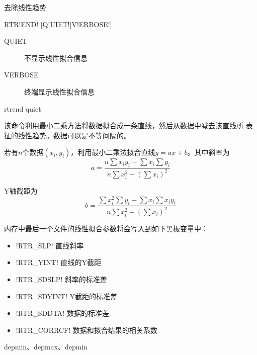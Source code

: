\label{cmd:rtrend}

去除线性趋势

\begin{SACSTX}
RTR!END! [Q!UIET!|V!ERBOSE!]
\end{SACSTX}

\begin{description}
\item [QUIET] 不显示线性拟合信息
\item [VERBOSE] 终端显示线性拟合信息
\end{description}

\begin{SACDFT}
rtrend quiet
\end{SACDFT}

该命令利用最小二乘方法将数据拟合成一条直线，然后从数据中减去该直线所
表征的线性趋势。数据可以是不等间隔的。

若有$n$个数据$(x_i,y_i)$，利用最小二乘法拟合直线$y=ax+b$。其中斜率为
\[
    a = \frac{n\sum x_i y_i - \sum x_i \sum y_i}
    {n\sum x_i^2 - (\sum x_i)^2}
\]

Y轴截距为
\[
    b = \frac{\sum x_i^2 \sum y_i - \sum x_i \sum x_i y_i}
    {n\sum x_i^2 - (\sum x_i)^2}
\]

内存中最后一个文件的线性拟合参数将会写入到如下黑板变量中：
\begin{itemize}
\item !RTR_SLP! 直线斜率
\item !RTR_YINT! 直线的Y截距
\item !RTR_SDSLP! 斜率的标准差
\item !RTR_SDYINT! Y截距的标准差
\item !RTR_SDDTA! 数据的标准差
\item !RTR_CORRCF! 数据和拟合结果的相关系数
\end{itemize}

depmin、depmax、depmin

